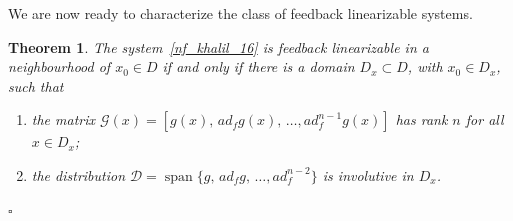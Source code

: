 \documentclass[11pt,a4paper,oneside]{book}
\numberwithin{equation}{section}
\DeclareMathOperator{\spn}{span}
\theoremstyle{it}
\newtheorem{thm}{Theorem}[chapter]
\theoremstyle{definition}
\begin{document}
We are now ready to characterize the class of feedback linearizable systems.
\begin{thm}\label{involutive_thm}
	The system~\eqref{nf_khalil_16} is feedback linearizable in a neighbourhood of $x_0\in D$ if and only if there is a domain $D_x\subset D$, with $x_0\in D_x$, such that
	\begin{enumerate}
		\item the matrix $\mathscr{G}(x)=[g(x),\,ad_fg(x),\,\dots,ad_f^{n-1}g(x)]$ has rank $n$ for all $x\in D_x$;
		\item the distribution $\mathscr{D}=\spn\{g,\,ad_fg,\,\dots,ad_f^{n-2}\}$ is involutive in $D_x$.
	\end{enumerate}
	
		\hfill$\square$
\end{thm}
\end{document}

